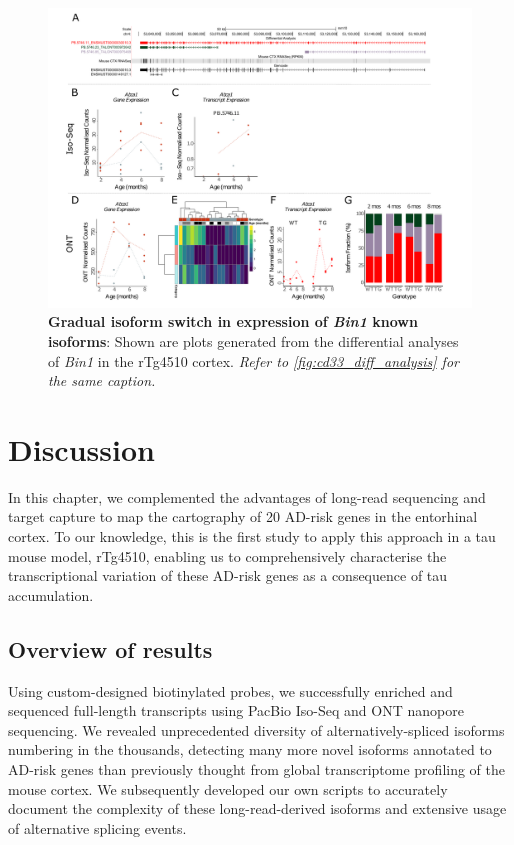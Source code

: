 \begin{landscape}
	\begin{figure}[htp]
		\begin{center}
			\includegraphics[page=6,trim={0 0.5cm 0 1.5cm},scale =0.85]{Figures/TargetGene_DifferentialAnalysis.pdf}
		\end{center}
		\captionsetup{width=1.5\textwidth}
		\caption[Gradual isoform switch in expression of \textit{Bin1} known isoforms]%
		{\textbf{Gradual isoform switch in expression of \textit{Bin1} known isoforms}: Shown are plots generated from the differential analyses of \textit{Bin1} in the rTg4510 cortex. \textit{Refer to \cref{fig:cd33_diff_analysis} for the same caption.}}   
		\label{fig:bin1_diff_analysis}
	\end{figure}
\end{landscape}



\newpage
\section{Discussion}
In this chapter, we complemented the advantages of long-read sequencing and target capture to map the cartography of 20 AD-risk genes in the entorhinal cortex. To our knowledge, this is the first study to apply this approach in a tau mouse model, rTg4510, enabling us to comprehensively characterise the transcriptional variation of these AD-risk genes as a consequence of tau accumulation.

\subsection{Overview of results}
Using custom-designed biotinylated probes, we successfully enriched and sequenced full-length transcripts using PacBio Iso-Seq and ONT nanopore sequencing. We revealed unprecedented diversity of alternatively-spliced isoforms numbering in the thousands, detecting many more novel isoforms annotated to AD-risk genes than previously thought from global transcriptome profiling of the mouse cortex. We subsequently developed our own scripts to accurately document the complexity of these long-read-derived isoforms and extensive usage of alternative splicing events. 

